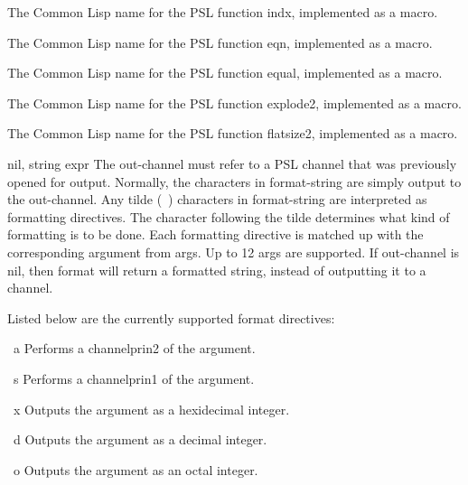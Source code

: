 {    The Common Lisp name for the PSL function indx,  implemented
    as a macro.
}

{}

{    The  Common  Lisp name for the PSL function eqn, implemented
    as a macro.
}

{    The Common Lisp name for the PSL function equal, implemented
    as a macro.
}

{}

{}

{    The  Common  Lisp  name  for  the  PSL  function   explode2,
    implemented as a macro.
}

{}

{    The  Common  Lisp  name  for  the  PSL  function  flatsize2,
    implemented as a macro.
}

{    {nil, string}                                           expr
    The out-channel  must  refer  to  a  PSL  channel  that  was
    previously  opened  for output.  Normally, the characters in
    format-string are simply output to  the  out-channel.    Any
    tilde  (~)  characters  in  format-string are interpreted as
    formatting directives.  The character  following  the  tilde
    determines  what  kind  of  formatting  is to be done.  Each
    formatting directive is matched up  with  the  corresponding
    argument from args.  Up to 12 args are supported.
}
    If  out-channel  is nil, then format will return a formatted
    string, instead of outputting it to a channel.

  Listed below are the currently supported format directives:

~a            Performs a channelprin2 of the argument.

~s            Performs a channelprin1 of the argument.

~x            Outputs the argument as a hexidecimal integer.

~d            Outputs the argument as a decimal integer.

~o            Outputs the argument as an octal integer.

